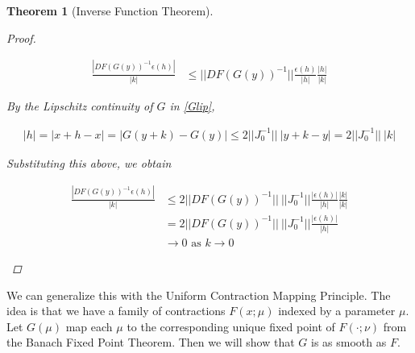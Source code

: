 \documentclass{article}
\newtheorem{theorem}{Theorem}[section]
\begin{document}
\begin{theorem}[Inverse Function Theorem]
\begin{proof}
\begin{enumerate}
\begin{align*}
\frac{| DF(G(y))^{-1}\epsilon(h)| }{|k|} 
&\leq || DF(G(y))^{-1}|| \frac{ \epsilon(h)}{|h|}\frac{|h|}{|k|}
\end{align*}

By the Lipschitz continuity of $G$ in \eqref{Glip}, 

\begin{align*}
|h| = |x + h - x| = |G(y + k) - G(y)| \leq 2 ||J_0^{-1}|| \: |y + k - y| = 2 ||J_0^{-1}|| \: |k|
\end{align*}

Substituting this above, we obtain

\begin{align*}
\frac{| DF(G(y))^{-1}\epsilon(h)| }{|k|} 
&\leq 2 ||DF(G(y))^{-1}|| \: ||J_0^{-1}|| \frac{ |\epsilon(h)|}{|h|}\frac{|k|}{|k|} \\
&= 2 ||DF(G(y))^{-1}|| \: ||J_0^{-1}|| \frac{ |\epsilon(h)|}{|h|} \\
&\rightarrow 0 \text{ as }k \rightarrow 0
\end{align*}

\end{enumerate}
\end{proof}
\end{theorem}

We can generalize this with the Uniform Contraction Mapping Principle. The idea is that we have a family of contractions $F(x; \mu)$ indexed by a parameter $\mu$. Let $G(\mu)$ map each $\mu$ to the corresponding unique fixed point of $F(\cdot; \nu)$ from the Banach Fixed Point Theorem. Then we will show that $G$ is as smooth as $F$.
\end{document}
